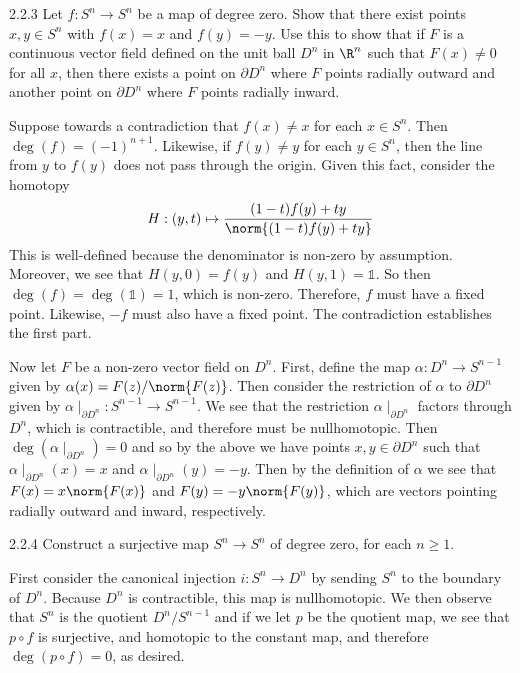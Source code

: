 \documentclass{article}
\begin{document}
\begin{exercise}{2.2.3}{\parindent}
  Let $f: S^n \to S^n$ be a map of degree zero. Show that there exist
  points $x,y \in S^n$ with $f(x) = x$ and $f(y) = -y$. Use this to
  show that if $F$ is a continuous vector field defined on the unit
  ball $D^n$ in $\R^n$ such that $F(x) \neq 0$ for all $x$, then there
  exists a point on $\partial D^n$ where $F$ points radially outward
  and another point on $\partial D^n$ where $F$ points radially
  inward.
\end{exercise}
\begin{solution}{\parindent}
  Suppose towards a contradiction that $f(x) \neq x$ for each $x \in
  S^n$. Then $\deg (f) = (-1)^{n+1}$. Likewise, if $f(y) \neq y$ for
  each $y \in S^n$, then the line from $y$ to $f(y)$ does not pass
  through the origin. Given this fact, consider the homotopy
  \[
  H: (y,t) \mapsto \frac{(1-t)f(y) + ty}{\norm{(1-t)f(y) + ty}}
  \]
  This is well-defined because the denominator is non-zero by
  assumption. Moreover, we see that $H(y,0) = f(y)$ and $H(y,1) =
  \mathbb{1}$. So then $\deg(f) = \deg(\mathbb{1}) = 1$, which is
  non-zero. Therefore, $f$ must have a fixed point. Likewise, $-f$
  must also have a fixed point. The contradiction establishes the
  first part.

  Now let $F$ be a non-zero vector field on $D^n$. First, define the
  map $\alpha: D^n \to S^{n-1}$ given by $\alpha(x) =
  F(z)/\norm{F(z)}$. Then consider the restriction of $\alpha$ to
  $\partial D^n$ given by $\alpha\mid_{\partial D^n}: S^{n-1} \to
  S^{n-1}$. We see that the restriction $\alpha\mid_{\partial D^n}$
  factors through $D^n$, which is contractible, and therefore must be
  nullhomotopic. Then $\deg (\alpha\mid_{\partial D^n}) = 0$ and so by
  the above we have points $x,y \in \partial D^n$ such that
  $\alpha\mid_{\partial D^n}(x) = x$ and $\alpha\mid_{\partial D^n}(y)
  = -y$. Then by the definition of $\alpha$ we see that $F(x) =
  x\norm{F(x)}$ and $F(y) = -y\norm{F(y)}$, which are vectors pointing
  radially outward and inward, respectively.
\end{solution}

\begin{exercise}{2.2.4}{\parindent}
  Construct a surjective map $S^n \to S^n$ of degree zero, for each $n
  \geq 1$.
\end{exercise}
\begin{solution}{\parindent}
  First consider the canonical injection $i:S^n \to D^n$ by sending
  $S^n$ to the boundary of $D^n$. Because $D^n$ is contractible, this
  map is nullhomotopic. We then observe that $S^n$ is the quotient
  $D^n/S^{n-1}$ and if we let $p$ be the quotient map, we see that
  $p\circ f$ is surjective, and homotopic to the constant map, and
  therefore $\deg(p\circ f) = 0$, as desired.
\end{solution}
\end{document}
